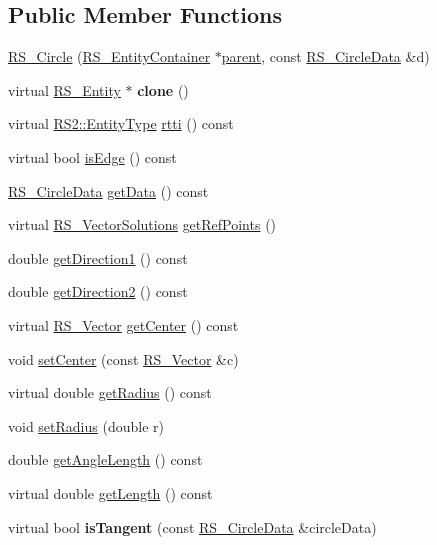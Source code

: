\subsection*{Public Member Functions}
\begin{DoxyCompactItemize}
\item 
\hyperlink{classRS__Circle_a0e693d1c9d2bdcb1ff4678b19322ad69}{R\-S\-\_\-\-Circle} (\hyperlink{classRS__EntityContainer}{R\-S\-\_\-\-Entity\-Container} $\ast$\hyperlink{classRS__Entity_a80358a8d2fc6739a516a278dc500b49f}{parent}, const \hyperlink{classRS__CircleData}{R\-S\-\_\-\-Circle\-Data} \&d)
\item 
\hypertarget{classRS__Circle_a109f219f521234d865f6a67daee1a107}{virtual \hyperlink{classRS__Entity}{R\-S\-\_\-\-Entity} $\ast$ {\bfseries clone} ()}\label{classRS__Circle_a109f219f521234d865f6a67daee1a107}

\item 
virtual \hyperlink{classRS2_a8f26d1b981e1e85cff16738b43337e6a}{R\-S2\-::\-Entity\-Type} \hyperlink{classRS__Circle_a4e40b8aa080005349d5381d447973078}{rtti} () const 
\item 
virtual bool \hyperlink{classRS__Circle_a928d2cbb5d1d59c90862f8513076a1bb}{is\-Edge} () const 
\item 
\hyperlink{classRS__CircleData}{R\-S\-\_\-\-Circle\-Data} \hyperlink{classRS__Circle_a311d73554f41f4b4cc962ed595761013}{get\-Data} () const 
\item 
virtual \hyperlink{classRS__VectorSolutions}{R\-S\-\_\-\-Vector\-Solutions} \hyperlink{classRS__Circle_a1e761406f510bcc328e77b8c73154614}{get\-Ref\-Points} ()
\item 
double \hyperlink{classRS__Circle_af8b02d75a9f364f1c6ad8d19fcb70b41}{get\-Direction1} () const 
\item 
double \hyperlink{classRS__Circle_aafd4a1d6639ba33dfe3194c0a1963cf0}{get\-Direction2} () const 
\item 
virtual \hyperlink{classRS__Vector}{R\-S\-\_\-\-Vector} \hyperlink{classRS__Circle_abb000208d06d392e963f2af9dd45dcb0}{get\-Center} () const 
\item 
void \hyperlink{classRS__Circle_a68e6c21e1552754550bdf36125991fec}{set\-Center} (const \hyperlink{classRS__Vector}{R\-S\-\_\-\-Vector} \&c)
\item 
virtual double \hyperlink{classRS__Circle_aeaa9d3b536f3f9fd00a0ba31d333522d}{get\-Radius} () const 
\item 
void \hyperlink{classRS__Circle_a2307e8a20989cf6195fa7dcf606724dd}{set\-Radius} (double r)
\item 
double \hyperlink{classRS__Circle_a2c1828e4c3d1f34f2dffd947d53dfb40}{get\-Angle\-Length} () const 
\item 
virtual double \hyperlink{classRS__Circle_a69bf4210b911976d1c7e9a8768f34250}{get\-Length} () const 
\item 
\hypertarget{classRS__Circle_aca216096676f44e10092488d8a5afe35}{virtual bool {\bfseries is\-Tangent} (const \hyperlink{classRS__CircleData}{R\-S\-\_\-\-Circle\-Data} \&circle\-Data)}\label{classRS__Circle_aca216096676f44e10092488d8a5afe35}


\end{DoxyCompactItemize}
